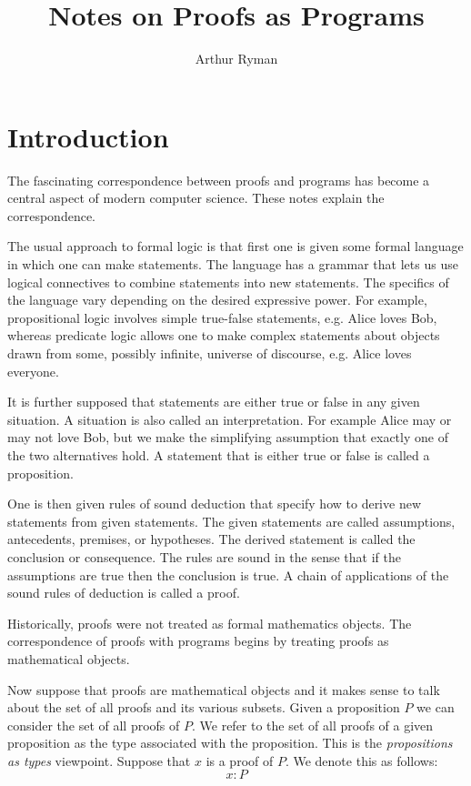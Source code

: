 \documentclass[11pt, oneside]{article}   	%
\title{Notes on Proofs as Programs}
\author{Arthur Ryman}
\date{}							%
\begin{document}
\maketitle

\section{Introduction}

The fascinating correspondence between proofs and programs has become a central aspect of modern
computer science.
These notes explain the correspondence.

The usual approach to formal logic is that first one is given some formal language in which one can make statements.
The language has a grammar that lets us use logical connectives to combine statements into new statements.
The specifics of the language vary depending on the desired expressive power.
For example, propositional logic involves simple true-false statements, e.g. Alice loves Bob, 
whereas predicate logic allows one to make complex statements about
objects drawn from some, possibly infinite, universe of discourse, e.g. Alice loves everyone.

It is further supposed that statements are either true or false in any given situation.
A situation is also called an interpretation.
For example Alice may or may not love Bob, but we make the simplifying assumption that exactly one of the two
alternatives hold.
A statement that is either true or false is called a proposition.

One is then given rules of sound deduction that specify how to derive new statements from given statements.
The given statements are called assumptions, antecedents, premises, or hypotheses.
The derived statement is called the conclusion or consequence.
The rules are sound in the sense that if the assumptions are true then the conclusion is true.
A chain of applications of the sound rules of deduction is called a proof.

Historically, proofs were not treated as formal mathematics objects.
The correspondence of proofs with programs begins by treating proofs as mathematical objects.

Now suppose that proofs are mathematical objects and it makes sense to talk about the set of all proofs
and its various subsets.
Given a proposition $P$ we can consider the set of all proofs of $P$.
We refer to the set of all proofs of a given proposition as the type associated with the proposition.
This is the {\it propositions as types} viewpoint.
Suppose that $x$ is a proof of $P$.
We denote this as follows:
$$
x : P
$$
\end{document}
